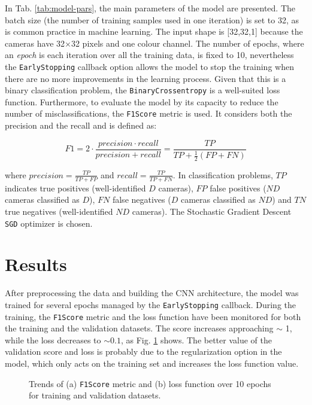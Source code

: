 In Tab. \ref{tab:model-pars}, the main parameters of the model are presented. The batch size (the number of training samples used in one iteration) is set to 32, as is common practice in machine learning. The input shape is [32,32,1] because the cameras have 32$\times$32 pixels and one colour channel. The number of epochs, where an \textit{epoch} is each iteration over all the training data, is fixed to 10, nevertheless the \texttt{EarlyStopping} callback option allows the model to stop the training when there are no more improvements in the learning process. Given that this is a binary classification problem, the \texttt{BinaryCrossentropy} is a well-suited loss function. Furthermore, to evaluate the model by its capacity to reduce the number of misclassifications, the \texttt{F1Score} metric is used. It considers both the precision and the recall and is defined as: 

\begin{equation}
    F1 = 2 \cdot \frac{precision \cdot recall}{precision + recall} = \frac{TP}{TP + \frac{1}{2}(FP + FN)}
\end{equation}

where $precision = \frac{TP}{TP + FP}$ and $recall = \frac{TP}{TP + FN}$. In classification problems, $TP$ indicates true positives (well-identified $D$ cameras), $FP$ false positives ($ND$ cameras classified as $D$), $FN$ false negatives ($D$ cameras classified as $ND$) and $TN$ true negatives (well-identified $ND$ cameras).
The Stochastic Gradient Descent \texttt{SGD} \cite{SGDoptimizer} optimizer is chosen.

\section{Results}
After preprocessing the data and building the CNN architecture, the model was trained for several epochs managed by the \texttt{EarlyStopping} callback. During the training, the \texttt{F1Score} metric and the loss function have been monitored for both the training and the validation datasets. The score increases approaching $\sim$ 1, while the loss decreases to $\sim 0.1$, as Fig. \ref{fig:trends} shows. The better value of the validation score and loss is probably due to the regularization option in the model, which only acts on the training set and increases the loss function value.

\begin{figure}[h!]
    \centering
    \caption{Trends of (a) \texttt{F1Score} metric and (b) loss function over 10 epochs for training and validation datasets.}
    \label{fig:trends}
\end{figure}

